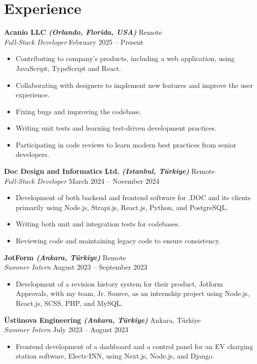 \documentclass[10pt,a4paper]{extarticle}
\begin{document}
\section{Experience}
\textbf{Acanio LLC \textit{(Orlando, Florida, USA)}} \hfill Remote\\
\textit{Full-Stack Developer} \hfill February 2025 -- Present
\begin{itemize}[leftmargin=*,noitemsep,topsep=0pt]
    \item Contributing to company's products, including a web application, using JavaScript, TypeScript and React.
    \item Collaborating with designers to implement new features and improve the user experience.
    \item Fixing bugs and improving the codebase.
    \item Writing unit tests and learning test-driven development practices.
    \item Participating in code reviews to learn modern best practices from senior developers.
\end{itemize}
\textbf{Doc Design and Informatics Ltd. \textit{(Istanbul, Türkiye)}} \hfill Remote\\
\textit{Full-Stack Developer} \hfill March 2024 -- November 2024
\begin{itemize}[leftmargin=*,noitemsep,topsep=0pt]
    \item Development of both backend and frontend software for .DOC and its clients primarily using Node.js, Strapi.js, React.js, Python, and PostgreSQL.
    \item Writing both unit and integration tests for codebases.
    \item Reviewing code and maintaining legacy code to ensure consistency.
\end{itemize}
\textbf{JotForm \textit{(Ankara, Türkiye)}} \hfill Remote\\
\textit{Summer Intern} \hfill August 2023 -- September 2023
\begin{itemize}[leftmargin=*,noitemsep,topsep=0pt]
    \item Development of a revision history system for their product, Jotform Approvals, with my team, Jr. Source, as an internship project using Node.js, React.js, SCSS, PHP, and MySQL.
\end{itemize}
\textbf{Üstünova Engineering \textit{(Ankara, Türkiye)}} \hfill Ankara, Türkiye\\
\textit{Summer Intern} \hfill July 2023 -- August 2023
\begin{itemize}[leftmargin=*,noitemsep,topsep=0pt]
    \item Frontend development of a dashboard and a control panel for an EV charging station software, Electr-INN, using Next.js, Node.js, and Django.
\end{itemize}
\end{document}
